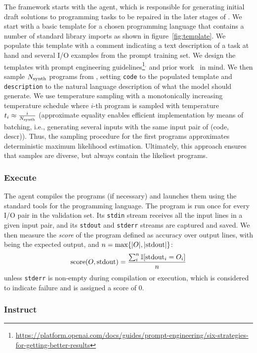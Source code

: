 The framework starts with the \synthesize{} agent, which is responsible for generating initial draft solutions to programming tasks to be repaired in the later stages of \method{}.
We start with a basic template for a chosen programming language that contains a number of standard library imports as shown in figure~\ref{fig:template}.
We populate this template with a comment indicating a text description of a task at hand and several I/O examples from the prompt training set.
We design the templates with prompt engineering guidelines\footnote{\url{https://platform.openai.com/docs/guides/prompt-engineering/six-strategies-for-getting-better-results}}$^{,}$ and prior work~\cite{debruin2021:autoencoders} in mind.
We then sample $N_\text{synth}{}$ programs from \synthmodel{}, setting \texttt{code} to the populated template and \texttt{description} to the natural language description of what the model should generate.
We use temperature sampling with a monotonically increasing temperature schedule where $i$-th program is sampled with temperature $t_i \approx \frac{i}{N_\text{synth}{}}$ (approximate equality enables efficient implementation by means of batching, i.e., generating several inputs with the same input pair of (code, descr)).
Thus, the sampling procedure for the first programs approximates deterministic maximum likelihood estimation.
Ultimately, this approach ensures that samples are diverse, but always contain the likeliest programs.

\subsubsection{Execute}
\label{sec:execute}

The \execute{} agent compiles the programs (if necessary) and launches them using the standard tools for the programming language.
The program is run once for every I/O pair in the validation set. 
Its \texttt{stdin} stream receives all the input lines in a given input pair, and its \texttt{stdout} and \texttt{stderr} streams are captured and saved.
We then measure the \emph{score} of the program defined as accuracy over output lines, with \expectedoutput{} being the expected output, and $n=\max\{|O{}|, |\text{stdout}|\}$:
\[    
\text{score}(O{}, \text{stdout}) = \frac{\sum^{n}_i{\mathbb{I}[\text{stdout}_i = O_i]}}{n} 
\]
unless \texttt{stderr} is non-empty during compilation or execution, which is considered to indicate failure and is assigned a score of 0.

\subsubsection{Instruct}
\label{sec:instruct}

